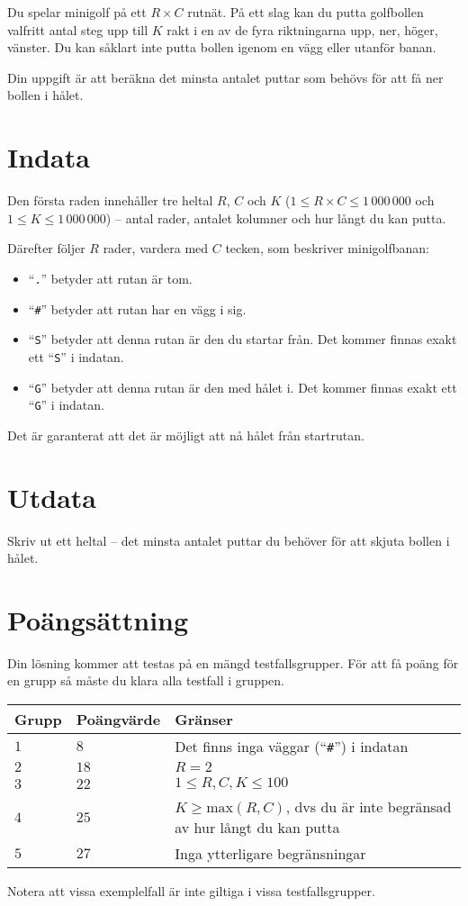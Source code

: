 

Du spelar minigolf på ett $R\times C$ rutnät.
På ett slag kan du putta golfbollen valfritt antal steg upp till $K$ rakt i en av de fyra riktningarna upp, ner, höger, vänster. Du kan såklart inte putta bollen igenom en vägg eller utanför banan.

Din uppgift är att beräkna det minsta antalet puttar som behövs för att få ner bollen i hålet.

\section*{Indata}
Den första raden innehåller tre heltal $R$, $C$ och $K$
($1 \le R\times C \le 1\,000\,000$ och $1\le K \le 1\,000\,000$) -- antal rader, antalet kolumner och hur långt du kan putta.

Därefter följer $R$ rader, vardera med $C$ tecken, som beskriver minigolfbanan:
\begin{itemize}
  \item ``\verb!.!'' betyder att rutan är tom.
  \item ``\verb!#!'' betyder att rutan har en vägg i sig.
  \item ``\verb!S!'' betyder att denna rutan är den du startar från. Det kommer finnas exakt ett ``\verb!S!'' i indatan.
  \item ``\verb!G!'' betyder att denna rutan är den med hålet i. Det kommer finnas exakt ett ``\verb!G!'' i indatan.
\end{itemize}

Det är garanterat att det är möjligt att nå hålet från startrutan.

\section*{Utdata}
Skriv ut ett heltal -- det minsta antalet puttar du behöver för att skjuta bollen i hålet.

\section*{Poängsättning}
Din lösning kommer att testas på en mängd testfallsgrupper.
För att få poäng för en grupp så måste du klara alla testfall i gruppen.

\noindent
\begin{tabular}{| l | l | l |}
  \hline
  Grupp & Poängvärde & Gränser \\ \hline
  $1$   & $8$        & Det finns inga väggar (``\verb!#!'') i indatan \\ \hline
  $2$   & $18$       & $R = 2$ \\ \hline
  $3$   & $22$       & $1\le R,C,K\le 100$ \\ \hline
  $4$   & $25$       & $K \ge \text{max}(R,C)$, dvs du är inte begränsad av hur långt du kan putta \\ \hline
  $5$   & $27$       & Inga ytterligare begränsningar \\ \hline
\end{tabular}

Notera att vissa exemplelfall är inte giltiga i vissa testfallsgrupper.

